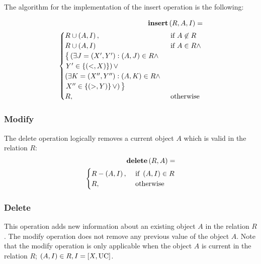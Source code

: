 The algorithm for the implementation of the insert operation is the following:

\begin{align}
\label{eq:insert-fuzzy-temporal}
\mbox{\textbf{insert}} \left(R ,A, I\right) =\\
\begin{cases}
\nonumber
R \cup \left(A, I \right), & \mbox{ if }  A \not \in R\\
R \cup   \left(A, I \right) & \mbox{ if }  A \in R \wedge \\
\big \lbrace \left( \exists J= \left(X', Y' \right): \left(A, J \right) \in R \wedge \right. \\
\left. Y' \in \left \lbrace \left(<, X \right)\right \rbrace  \right) \vee \\
\left( \exists K= \left(X'', Y'' \right): \left(A, K \right) \in R \wedge \right. \\
\left. X'' \in \left \lbrace \left(>, Y \right)\right \rbrace \vee \right) \big \rbrace\\
R, & \mbox{ otherwise }  
\end{cases} 	
\end{align}
\subsubsection{\label{subsubsec:modify-fuzzy-temporal}Modify}
The delete operation logically removes a current object $A$ which is valid in the relation $R$:
\begin{align}
\label{eq:delete-fuzzy-temporal}
\mbox{\textbf{delete}} \left(R ,A \right) =\\
\begin{cases}
\nonumber
R - \left(A, I \right), & \mbox{ if } \left( A, I \right) \in R\\
R, & \mbox{ otherwise }  
\end{cases} 	
\end{align}

\subsubsection{\label{subsubsec:delete-fuzzy-temporal}Delete}
This operation adds new information about an existing object $A$ in the relation $R$. The modify operation does not remove any previous value of the object $A$.
Note that the modify operation is only applicable when the object $A$ is current in the relation $R$; $ \left(A, I \right) \in R, I = \left[X, \operatorname{UC} \right]$.

